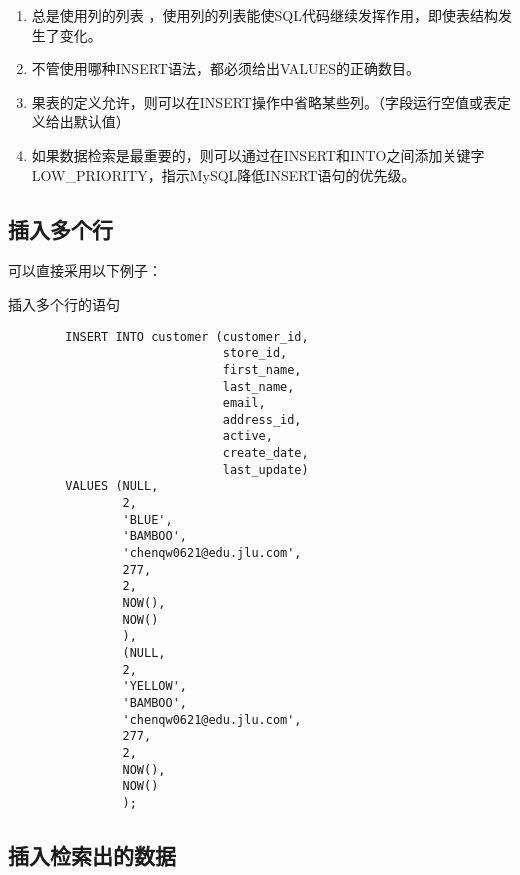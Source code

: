 \documentclass[UTF8]{article}
\begin{document}
\begin{orangebox}[frametitle={Tips 19.1.1 插入列的注意事项}]
        \begin{enumerate}
                \item 总是使用列的列表 ，使用列的列表能使SQL代码继续发挥作用，即使表结构发生了变化。
                \item 不管使用哪种INSERT语法，都必须给出VALUES的正确数目。
                \item 果表的定义允许，则可以在INSERT操作中省略某些列。（字段运行空值或表定义给出默认值）
                \item 如果数据检索是最重要的，则可以通过在INSERT和INTO之间添加关键字LOW\_PRIORITY，指示MySQL降低INSERT语句的优先级。
        \end{enumerate}
\end{orangebox}

\subsection{插入多个行}

可以直接采用以下例子：

\begin{listing}[H]
        \caption{插入多个行的语句}
	\label{code:insertmultirowclause}
\begin{verbatim}
        INSERT INTO customer (customer_id,
                              store_id,
                              first_name,
                              last_name,
                              email,
                              address_id,
                              active,
                              create_date,
                              last_update)
        VALUES (NULL,
                2,
                'BLUE',
                'BAMBOO',
                'chenqw0621@edu.jlu.com', 
                277,
                2,
                NOW(),
                NOW()
                ),
                (NULL,
                2,
                'YELLOW',
                'BAMBOO',
                'chenqw0621@edu.jlu.com', 
                277,
                2,
                NOW(),
                NOW()
                );
\end{verbatim}
\end{listing}

\subsection{插入检索出的数据}
\end{document}
